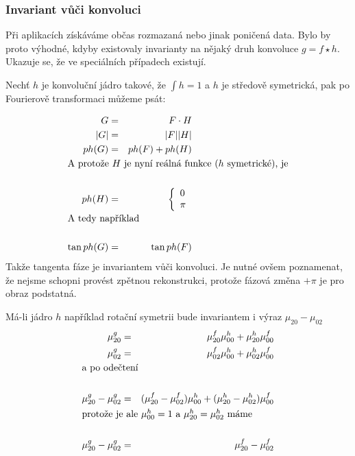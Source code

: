 \subsubsection{Invariant vůči konvoluci}
Při aplikacích získáváme občas rozmazaná nebo jinak poničená data. Bylo by proto výhodné, kdyby
existovaly invarianty na nějaký druh konvoluce $g=f\star h$. Ukazuje se, že ve speciálních případech
existují. 

Nechť $h$ je konvoluční jádro takové, že $\int h=1$ a $h$ je středově symetrická, pak po Fourierově 
transformaci můžeme psát:

\begin{eqnarray}
G&=&F\cdot H\\
|G|&=&|F||H|\\
ph(G)&=&ph(F)+ph(H)\\
\noalign{\hbox{A protože $H$ je nyní reálná funkce ($h$ symetrické), je}\nonumber}\\
ph(H)&=&\left\{\begin{array}{ll}0\\\pi\end{array}\right.\\
\noalign{\hbox{A tedy například}\nonumber}\\
\tan ph(G)&=&\tan ph(F)
\end{eqnarray}
\noindent Takže tangenta fáze je invariantem vůči konvoluci. Je nutné ovšem poznamenat, že 
nejsme schopni provést zpětnou rekonstrukci, protože fázová změna $+\pi$ je pro obraz podstatná.

Má-li jádro $h$ například rotační symetrii bude invariantem i výraz $\mu_{20}-\mu_{02}$ 
\begin{eqnarray}
\mu_{20}^g&=&\mu_{20}^f\mu_{00}^h+\mu_{20}^h\mu_{00}^f\\
\mu_{02}^g&=&\mu_{02}^f\mu_{00}^h+\mu_{02}^h\mu_{00}^f\\
\noalign{\hbox{a po odečtení}\nonumber}\\
\mu_{20}^g-\mu_{02}^g&=&(\mu_{20}^f-\mu_{02}^f)\mu_{00}^h+(\mu_{20}^h-\mu_{02}^h)\mu_{00}^f\\
\noalign{\hbox{protože je ale $\mu_{00}^h=1$ a $\mu_{20}^h=\mu_{02}^h$ máme}\nonumber}\\
\mu_{20}^g-\mu_{02}^g&=&\mu_{20}^f-\mu_{02}^f
\end{eqnarray}

